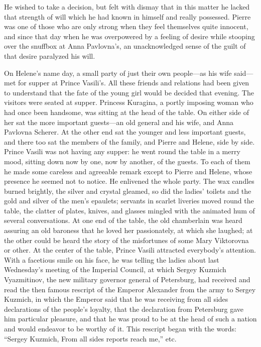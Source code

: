 He wished to take a decision, but felt with dismay that in this
matter he lacked that strength of will which he had known in
himself and really possessed. Pierre was one of those who are
only strong when they feel themselves quite innocent, and since
that day when he was overpowered by a feeling of desire while
stooping over the snuffbox at Anna Pavlovna's, an unacknowledged
sense of the guilt of that desire paralyzed his will.

On Helene's name day, a small party of just their own people---as
his wife said---met for supper at Prince Vasili's. All these
friends and relations had been given to understand that the fate
of the young girl would be decided that evening. The visitors
were seated at supper.  Princess Kuragina, a portly imposing
woman who had once been handsome, was sitting at the head of the
table. On either side of her sat the more important guests---an
old general and his wife, and Anna Pavlovna Scherer. At the other
end sat the younger and less important guests, and there too sat
the members of the family, and Pierre and Helene, side by
side. Prince Vasili was not having any supper: he went round the
table in a merry mood, sitting down now by one, now by another,
of the guests.  To each of them he made some careless and
agreeable remark except to Pierre and Helene, whose presence he
seemed not to notice. He enlivened the whole party. The wax
candles burned brightly, the silver and crystal gleamed, so did
the ladies' toilets and the gold and silver of the men's
epaulets; servants in scarlet liveries moved round the table, the
clatter of plates, knives, and glasses mingled with the animated
hum of several conversations. At one end of the table, the old
chamberlain was heard assuring an old baroness that he loved her
passionately, at which she laughed; at the other could be heard
the story of the misfortunes of some Mary Viktorovna or other. At
the center of the table, Prince Vasili attracted everybody's
attention. With a facetious smile on his face, he was telling the
ladies about last Wednesday's meeting of the Imperial Council, at
which Sergey Kuzmich Vyazmitinov, the new military governor
general of Petersburg, had received and read the then famous
rescript of the Emperor Alexander from the army to Sergey
Kuzmich, in which the Emperor said that he was receiving from all
sides declarations of the people's loyalty, that the declaration
from Petersburg gave him particular pleasure, and that he was
proud to be at the head of such a nation and would endeavor to be
worthy of it. This rescript began with the words: ``Sergey
Kuzmich, From all sides reports reach me,'' etc.

